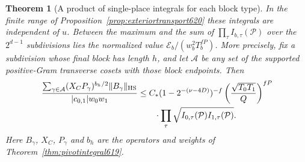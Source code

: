 \documentclass[a4paper,11pt]{article}
\newtheorem{theorem}[proposition]{Theorem}
\theoremstyle{definition}
\theoremstyle{remark}
\numberwithin{equation}{section}
\begin{document}
\begin{theorem}[A product of single-place integrals for each block type]
\leavevmode\label{thm:blockproduct620}
In the finite range of Proposition~\ref{prop:exteriortransport620}
these integrals are independent of \(u\). Between the maximum and
the sum of \(\prod_\tau I_{b,\tau}(\mathcal P)\) over the \(2^{d-1}\)
subdivisions lies the normalized value
\(\mathcal E_b/(w_b^2 T_b^{fP})\). More precisely, fix a subdivision
whose final block has length \(h\), and let \(\mathcal A\) be any
set of the supported positive-Gram transverse cosets with those
block endpoints. Then
\begin{align*}
 \frac{\sum_{\gamma\in\mathcal A}(X_C P_\gamma)^{b_h/2}
                 \|B_\gamma\|_{\rm HS}}
      {|c_{0,1}|w_0w_1}
 &\le C_*(1-2^{-(\nu-4D)})^{-f}
              \left(\frac{\sqrt{T_0T_1}}{Q}\right)^{fP}\\
 &\qquad{}\cdot\prod_\tau
          \sqrt{I_{0,\tau}(\mathcal P)I_{1,\tau}(\mathcal P)} .
\end{align*}
Here \(B_\gamma\), \(X_C\), \(P_\gamma\) and \(b_h\) are the
operators and weights of Theorem~\ref{thm:pivotintegral619}.
\end{theorem}
\end{document}
